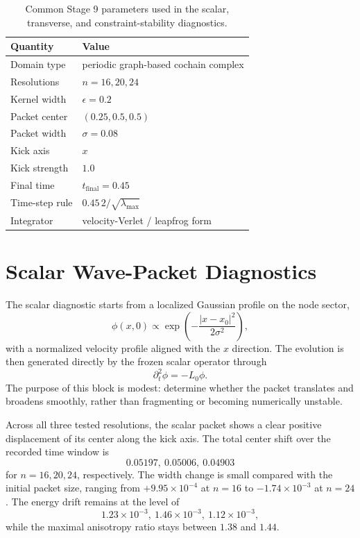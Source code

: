 \documentclass[11pt]{article}
\begin{document}
\begin{table}[t]
\centering
\begin{tabular}{ll}
\hline
Quantity & Value \\
\hline
Domain type & periodic graph-based cochain complex \\
Resolutions & $n = 16,20,24$ \\
Kernel width & $\epsilon = 0.2$ \\
Packet center & $(0.25,0.5,0.5)$ \\
Packet width & $\sigma = 0.08$ \\
Kick axis & $x$ \\
Kick strength & $1.0$ \\
Final time & $t_{\mathrm{final}} = 0.45$ \\
Time-step rule & $0.45\,2/\sqrt{\lambda_{\max}}$ \\
Integrator & velocity-Verlet / leapfrog form \\
\hline
\end{tabular}
\caption{Common Stage 9 parameters used in the scalar, transverse, and constraint-stability diagnostics.}
\label{tab:common-parameters}
\end{table}

\section{Scalar Wave-Packet Diagnostics}
The scalar diagnostic starts from a localized Gaussian profile on the node sector,
\begin{equation}
\phi(x,0) \propto \exp\!\left(-\frac{|x-x_0|^2}{2\sigma^2}\right),
\end{equation}
with a normalized velocity profile aligned with the $x$ direction. The evolution is then generated directly by the frozen scalar operator through
\begin{equation}
\partial_t^2 \phi = -L_0\phi.
\end{equation}
The purpose of this block is modest: determine whether the packet translates and broadens smoothly, rather than fragmenting or becoming numerically unstable.

Across all three tested resolutions, the scalar packet shows a clear positive displacement of its center along the kick axis. The total center shift over the recorded time window is
\begin{equation}
0.05197,\ 0.05006,\ 0.04903
\end{equation}
for $n=16,20,24$, respectively. The width change is small compared with the initial packet size, ranging from $+9.95\times 10^{-4}$ at $n=16$ to $-1.74\times 10^{-3}$ at $n=24$. The energy drift remains at the level of
\begin{equation}
1.23\times 10^{-3},\ 1.46\times 10^{-3},\ 1.12\times 10^{-3},
\end{equation}
while the maximal anisotropy ratio stays between $1.38$ and $1.44$.
\end{document}
